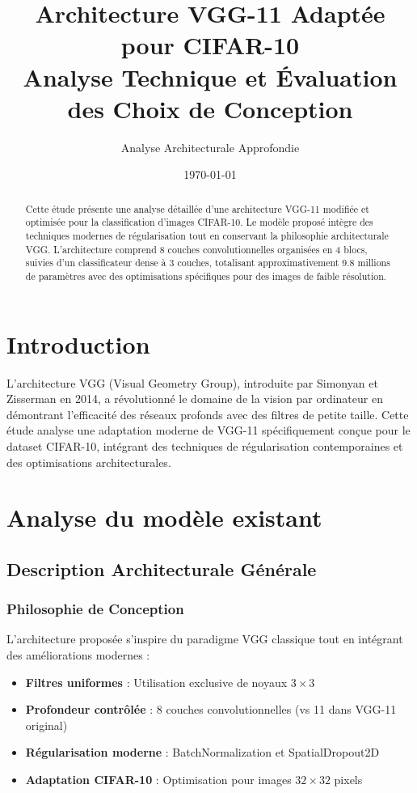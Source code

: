 \documentclass[12pt,a4paper]{article}
\title{\textbf{Architecture VGG-11 Adaptée pour CIFAR-10} \\
\large{Analyse Technique et Évaluation des Choix de Conception}}
\author{Analyse Architecturale Approfondie}
\date{\today}
\begin{document}
\maketitle

\begin{abstract}
Cette étude présente une analyse détaillée d'une architecture VGG-11 modifiée et optimisée pour la classification d'images CIFAR-10. Le modèle proposé intègre des techniques modernes de régularisation tout en conservant la philosophie architecturale VGG. L'architecture comprend 8 couches convolutionnelles organisées en 4 blocs, suivies d'un classificateur dense à 3 couches, totalisant approximativement 9.8 millions de paramètres avec des optimisations spécifiques pour des images de faible résolution.
\end{abstract}

\tableofcontents
\newpage

\section{Introduction}

L'architecture VGG (Visual Geometry Group), introduite par Simonyan et Zisserman en 2014, a révolutionné le domaine de la vision par ordinateur en démontrant l'efficacité des réseaux profonds avec des filtres de petite taille. Cette étude analyse une adaptation moderne de VGG-11 spécifiquement conçue pour le dataset CIFAR-10, intégrant des techniques de régularisation contemporaines et des optimisations architecturales.
\section{Analyse du modèle existant}
\subsection{Description Architecturale Générale}

\subsubsection{Philosophie de Conception}

L'architecture proposée s'inspire du paradigme VGG classique tout en intégrant des améliorations modernes :

\begin{itemize}
    \item \textbf{Filtres uniformes} : Utilisation exclusive de noyaux $3 \times 3$
    \item \textbf{Profondeur contrôlée} : 8 couches convolutionnelles (vs 11 dans VGG-11 original)
    \item \textbf{Régularisation moderne} : BatchNormalization et SpatialDropout2D
    \item \textbf{Adaptation CIFAR-10} : Optimisation pour images $32 \times 32$ pixels
\end{itemize}
\end{document}

